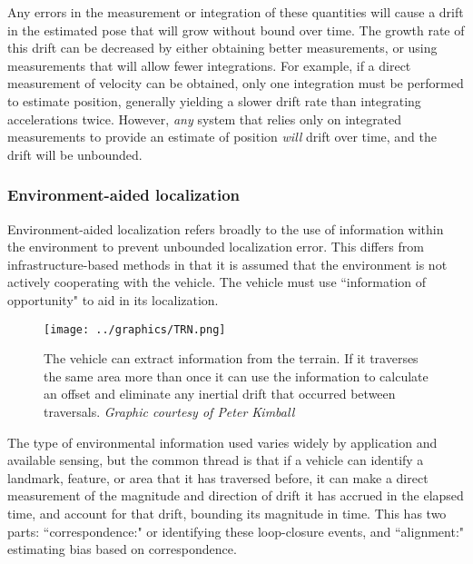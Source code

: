 Any errors in the measurement or integration of these quantities will cause a drift in the estimated pose that will grow without bound over time. The growth rate of this drift can be decreased by either obtaining better measurements, or using measurements that will allow fewer integrations. For example, if a direct measurement of velocity can be obtained, only one integration must be performed to estimate position, generally yielding a slower drift rate than integrating accelerations twice. However, \emph{any} system that relies only on integrated measurements to provide an estimate of position \emph{will} drift over time, and the drift will be unbounded. 

\subsubsection{Environment-aided localization}

Environment-aided localization refers broadly to the use of information within the environment to prevent unbounded localization error. This differs from infrastructure-based methods in that it is assumed that the environment is not actively cooperating with the vehicle. The vehicle must use ``information of opportunity" to aid in its localization. 

\begin{figure}[!htb]
   \centering
   \texttt{[image: ../graphics/TRN.png]} %
   \caption{The vehicle can extract information from the terrain. If it traverses the same area more than once it can use the information to calculate an offset and eliminate any inertial drift that occurred between traversals. \emph{Graphic courtesy of Peter Kimball}}
   \label{fig:TRN}
\end{figure}

The type of environmental information used varies widely by application and available sensing, but the common thread is that if a vehicle can identify a landmark, feature, or area that it has traversed before, it can make a direct measurement of the magnitude and direction of drift it has accrued in the elapsed time, and account for that drift, bounding its magnitude in time. This has two parts: ``correspondence:" or identifying these loop-closure events, and ``alignment:" estimating bias based on correspondence. 

